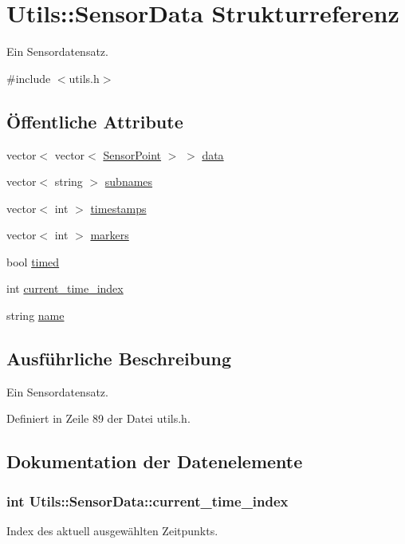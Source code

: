 \hypertarget{structUtils_1_1SensorData}{\section{Utils\-:\-:Sensor\-Data Strukturreferenz}
\label{structUtils_1_1SensorData}
}


Ein Sensordatensatz.  




{\ttfamily \#include $<$utils.\-h$>$}

\subsection*{Öffentliche Attribute}
\begin{DoxyCompactItemize}
\item 
vector$<$ vector$<$ \hyperlink{structUtils_1_1SensorPoint}{Sensor\-Point} $>$ $>$ \hyperlink{structUtils_1_1SensorData_ae94e7645dc0b6adfd21571b0abd5e309}{data}
\item 
vector$<$ string $>$ \hyperlink{structUtils_1_1SensorData_ad5875ab7e8ebdc9dc41a7b9ef1c063ba}{subnames}
\item 
vector$<$ int $>$ \hyperlink{structUtils_1_1SensorData_a654f9606c3ddc6e93afb86a116d11ea5}{timestamps}
\item 
vector$<$ int $>$ \hyperlink{structUtils_1_1SensorData_ac2d7e037f39affd6ad9d4aa29ed579da}{markers}
\item 
bool \hyperlink{structUtils_1_1SensorData_aca94c3ec7e8f2e719f7cfcff4e9da41b}{timed}
\item 
int \hyperlink{structUtils_1_1SensorData_a177d53154d56fcf1962f969ece1e7d9d}{current\-\_\-time\-\_\-index}
\item 
string \hyperlink{structUtils_1_1SensorData_a52474d0fe0dce0d3ee73c007a150a507}{name}
\end{DoxyCompactItemize}


\subsection{Ausführliche Beschreibung}
Ein Sensordatensatz. 

Definiert in Zeile 89 der Datei utils.\-h.



\subsection{Dokumentation der Datenelemente}
\hypertarget{structUtils_1_1SensorData_a177d53154d56fcf1962f969ece1e7d9d}{
\subsubsection[{current\-\_\-time\-\_\-index}]{\setlength{\rightskip}{0pt plus 5cm}int Utils\-::\-Sensor\-Data\-::current\-\_\-time\-\_\-index}}\label{structUtils_1_1SensorData_a177d53154d56fcf1962f969ece1e7d9d}
Index des aktuell ausgewählten Zeitpunkts. 

